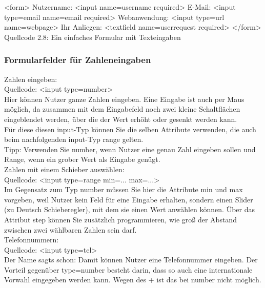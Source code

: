 <form>
Nutzername: <input name=username required>
E-Mail: <input type=email name=email required>
Webanwendung: <input type=url name=webpage>
Ihr Anliegen: <textfield name=userrequest required>
</form>
Quellcode 2.8: Ein einfaches Formular mit Texteingaben

\subsubsection{Formularfelder für Zahleneingaben}

Zahlen eingeben:\\

Quellcode: <input type=number>\\

Hier können Nutzer ganze Zahlen eingeben. Eine Eingabe ist auch per Maus möglich, da zusammen mit dem Eingabefeld noch zwei kleine Schaltflächen eingeblendet werden, über die der Wert erhöht oder gesenkt werden kann.\\

Für diese diesen input-Typ können Sie die selben Attribute verwenden, die auch beim nachfolgenden input-Typ range gelten. \\

Tipp: Verwenden Sie number, wenn Nutzer eine genau Zahl eingeben sollen und Range, wenn ein grober Wert als Eingabe genügt.\\

Zahlen mit einem Schieber auswählen:\\

Quellcode: <input type=range min=... max=...>\\

Im Gegensatz zum Typ number müssen Sie hier die Attribute min und max vorgeben, weil Nutzer kein Feld für eine Eingabe erhalten, sondern einen Slider (zu Deutsch Schieberegler), mit dem sie einen Wert anwählen können. Über das Attribut step können Sie zusätzlich programmieren, wie groß der Abstand zwischen zwei wählbaren Zahlen sein darf.\\

Telefonnummern:\\

Quellcode: <input type=tel>\\

Der Name sagts schon: Damit können Nutzer eine Telefonnummer eingeben. Der Vorteil gegenüber type=number besteht darin, dass so auch eine internationale Vorwahl eingegeben werden kann. Wegen des + ist das bei number nicht möglich.\\

